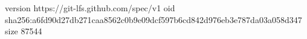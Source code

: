version https://git-lfs.github.com/spec/v1
oid sha256:a6fd90d27db271caa8562c0b9e09dcf597b6cd842d976eb3e787da03a058d347
size 87544
